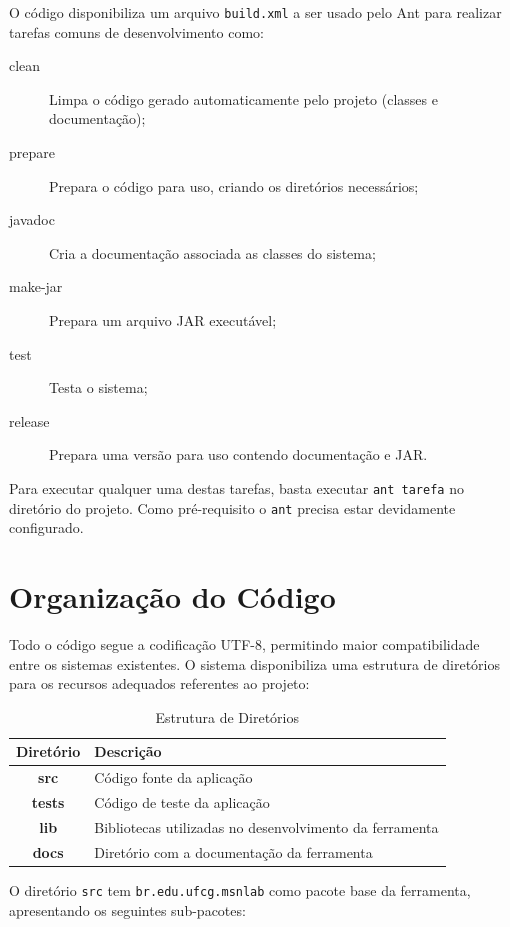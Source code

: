 \documentclass[a4paper,10pt]{report}
\begin{document}
O código disponibiliza um arquivo \texttt{build.xml} a ser usado pelo Ant\cite{ant} para realizar tarefas comuns de desenvolvimento como:

\begin{description}
 \item[clean] Limpa o código gerado automaticamente pelo projeto (classes e documentação);
 \item[prepare] Prepara o código para uso, criando os diretórios necessários;
 \item[javadoc] Cria a documentação associada as classes do sistema;
 \item[make-jar] Prepara um arquivo JAR executável;
 \item[test] Testa o sistema;
 \item[release] Prepara uma versão para uso contendo documentação e JAR.
 \end{description}

Para executar qualquer uma destas tarefas, basta executar \texttt{ant tarefa} no diretório do projeto. Como pré-requisito o \texttt{ant} precisa estar devidamente configurado.

\section{Organização do Código}

Todo o código segue a codificação UTF-8, permitindo maior compatibilidade entre os sistemas existentes. O sistema disponibiliza uma estrutura de diretórios para os recursos adequados referentes ao projeto:

\begin{table}[h]
\centering
\caption{Estrutura de Diretórios}
        \begin{tabular}{|c|p{2in}|}
        \hline
        \textbf{Diretório} & \textbf{Descrição} \\ \hline
        \textbf{src} & Código fonte da aplicação \\ \hline
        \textbf{tests} & Código de teste da aplicação \\ \hline
        \textbf{lib} & Bibliotecas utilizadas no desenvolvimento da ferramenta \\ \hline
        \textbf{docs} & Diretório com a documentação da ferramenta \\ \hline
        \end{tabular}
\label{tab:diretorios}
\end{table} 

O diretório \texttt{src} tem \texttt{br.edu.ufcg.msnlab} como pacote base da ferramenta, apresentando os seguintes sub-pacotes:
\end{document}
